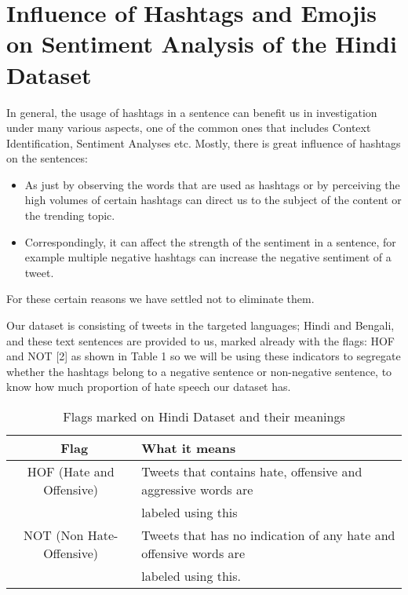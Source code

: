 \documentclass{article}
\begin{document}
\section{Influence of Hashtags and Emojis on Sentiment Analysis of the Hindi Dataset}
\label{headings}

In general, the usage of hashtags in a sentence can benefit us in investigation under many various aspects, one of the common ones that includes Context Identification, Sentiment Analyses etc. Mostly, there is great influence of hashtags on the sentences:

\begin{itemize}
    \item As just by observing the words that are used as hashtags or by perceiving the high volumes of certain hashtags can direct us to the subject of the content or the trending topic. 
   \item Correspondingly, it can affect the strength of the sentiment in a sentence, for example multiple negative hashtags can increase the negative sentiment of a tweet.
\end{itemize}

For these certain reasons we have settled not to eliminate them. 

Our dataset is consisting of tweets in the targeted languages; Hindi and Bengali, and these text sentences are provided to us, marked already with the flags: HOF and NOT [2] as shown in Table 1 so we will be using these indicators to segregate whether the hashtags belong to a negative sentence or non-negative sentence, to know how much proportion of hate speech our dataset has.

\begin{table}

  \caption{Flags marked on Hindi Dataset and their meanings}
  \label{Table 3.0}
  \centering
  \begin{tabular}{cl}
    \toprule                \
    Flag     & What it means \\
    \midrule
    HOF (Hate and Offensive)     & Tweets that contains hate, offensive and aggressive words are \\ & labeled using this \\
    NOT (Non Hate-Offensive)     & Tweets that has no indication of any hate and offensive words are \\ & labeled using this.  \\
    \bottomrule
  \end{tabular}
\end{table}
\end{document}
